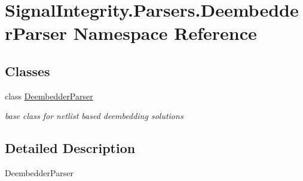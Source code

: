 \hypertarget{namespaceSignalIntegrity_1_1Parsers_1_1DeembedderParser}{}\section{Signal\+Integrity.\+Parsers.\+Deembedder\+Parser Namespace Reference}
\label{namespaceSignalIntegrity_1_1Parsers_1_1DeembedderParser}
\subsection*{Classes}
\begin{DoxyCompactItemize}
\item 
class \hyperlink{classSignalIntegrity_1_1Parsers_1_1DeembedderParser_1_1DeembedderParser}{Deembedder\+Parser}
\begin{DoxyCompactList}\small\item\em base class for netlist based deembedding solutions \end{DoxyCompactList}\end{DoxyCompactItemize}


\subsection{Detailed Description}
\begin{DoxyVerb}DeembedderParser\end{DoxyVerb}
 